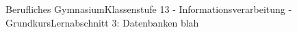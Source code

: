 \documentclass[11pt,oneside,openany,headings=optiontotoc,11pt,numbers=noenddot]{article}
\begin{document}
	\begin{worksheet}{Berufliches Gymnasium}{Klassenstufe 13 - Informationsverarbeitung - Grundkurs}{Lernabschnitt 3: Datenbanken}
		\setlength{\columnseprule}{0pt}
		blah
	\end{worksheet}
\end{document}
